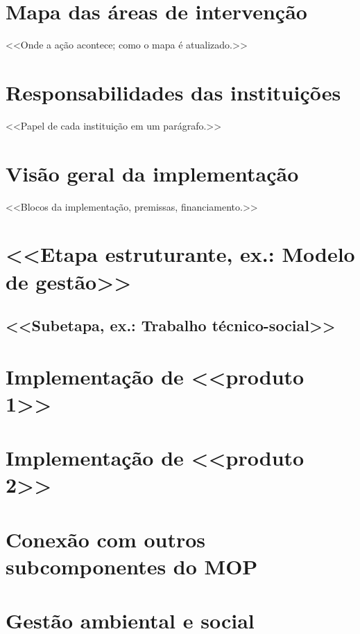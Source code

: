 \section{Mapa das áreas de intervenção}
<<Onde a ação acontece; como o mapa é atualizado.>>

\section{Responsabilidades das instituições}
<<Papel de cada instituição em um parágrafo.>>

\section{Visão geral da implementação}
<<Blocos da implementação, premissas, financiamento.>>

\section{<<Etapa estruturante, ex.: Modelo de gestão>>}
\subsection{<<Subetapa, ex.: Trabalho técnico-social>>}

\section{Implementação de <<produto 1>>}

\section{Implementação de <<produto 2>>}

\section{Conexão com outros subcomponentes do MOP}

\section{Gestão ambiental e social}


